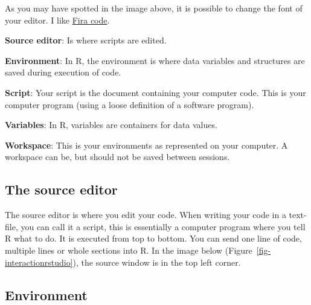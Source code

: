 \documentclass[
  11pt,
  letterpaper,
]{scrbook}
\begin{document}
As you may have spotted in the image above, it is possible to change the
font of your editor. I like
\href{https://github.com/tonsky/FiraCode/wiki/RStudio-instructions}{Fira
code}.

\begin{tcolorbox}[enhanced jigsaw, coltitle=black, titlerule=0mm, colframe=quarto-callout-tip-color-frame, colbacktitle=quarto-callout-tip-color!10!white, opacitybacktitle=0.6, breakable, left=2mm, opacityback=0, bottomtitle=1mm, bottomrule=.15mm, colback=white, toptitle=1mm, arc=.35mm, title=\textcolor{quarto-callout-tip-color}{\faLightbulb}\hspace{0.5em}{Defining concepts}, leftrule=.75mm, toprule=.15mm, rightrule=.15mm]

\textbf{Source editor}: Is where scripts are edited.

\textbf{Environment}: In R, the environment is where data variables and
structures are saved during execution of code.

\textbf{Script}: Your script is the document containing your computer
code. This is your computer program (using a loose definition of a
software program).

\textbf{Variables}: In R, variables are containers for data values.

\textbf{Workspace}: This is your environments as represented on your
computer. A workspace can be, but should not be saved between sessions.

\end{tcolorbox}

\hypertarget{the-source-editor}{%
\subsection{The source editor}\label{the-source-editor}}

The source editor is where you edit your code. When writing your code in
a text-file, you can call it a script, this is essentially a computer
program where you tell R what to do. It is executed from top to bottom.
You can send one line of code, multiple lines or whole sections into R.
In the image below (Figure~\ref{fig-interactionrstudio}), the source
window is in the top left corner.

\hypertarget{environment}{%
\subsection{Environment}\label{environment}}
\end{document}
